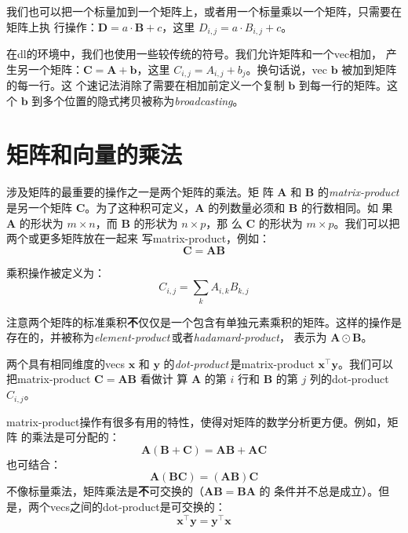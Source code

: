 我们也可以把一个标量加到一个矩阵上，或者用一个标量乘以一个矩阵，只需要在矩阵上执
行操作：$\pmb{D} = a \cdot \pmb{B} + c$，这里 $D_{i,j} = a \cdot B_{i,j} + c$。

在\gls*{dl}的环境中，我们也使用一些较传统的符号。我们允许矩阵和一个\gls*{vec}相加，
产生另一个矩阵：$\pmb{C} = \pmb{A} + \pmb{b}$，这里
$C_{i,j} = A_{i,j} + b_j$。换句话说，\gls*{vec} $\pmb{b}$ 被加到矩阵的每一行。这
个速记法消除了需要在相加前定义一个复制 $\pmb{b}$ 到每一行的矩阵。这个 $\pmb{b}$
到多个位置的隐式拷贝被称为\emph{\gls{broadcasting}}。

\section{矩阵和向量的乘法}
\label{sec:multiplying_matrices_and_vectors}

涉及矩阵的最重要的操作之一是两个矩阵的乘法。矩
阵 $\pmb{A}$ 和 $\pmb{B}$ 的\emph{\gls{matrix-product}}\,是另一个矩阵
$\pmb{C}$。为了这种积可定义，$\pmb{A}$ 的列数量必须和 $\pmb{B}$ 的行数相同。如
果 $\pmb{A}$ 的形状为 $m \times n$，而 $\pmb{B}$ 的形状为 $n \times p$，那
么 $\pmb{C}$ 的形状为 $m \times p$。我们可以把两个或更多矩阵放在一起来
写\gls*{matrix-product}，例如：
\begin{equation}
  \pmb{C} = \pmb{A}\pmb{B}
  \label{eq:matrix_product}
\end{equation}

乘积操作被定义为：
\begin{equation}
  C_{i,j} = \sum_{k}A_{i,k}B_{k,j}
  \label{eq:product_operation}
\end{equation}

注意两个矩阵的标准乘积\textbf{不}仅仅是一个包含有单独元素乘积的矩阵。这样的操作是
存在的，并被称为\emph{\gls{element-product}}\,或者\emph{\gls{hadamard-product}}，
表示为 $\pmb{A} \odot \pmb{B}$。

两个具有相同维度的\gls*{vecs}
$\pmb{x}$ 和 $\pmb{y}$ 的\emph{\gls{dot-product}}\,是\gls*{matrix-product}
$\pmb{x}^{\top}\pmb{y}$。我们可以把\gls*{matrix-product} $\pmb{C} =
\pmb{A}\pmb{B}$ 看做计
算 $\pmb{A}$ 的第 $i$ 行和 $\pmb{B}$ 的第 $j$ 列的\gls*{dot-product} $C_{i,j}$。

\gls*{matrix-product}操作有很多有用的特性，使得对矩阵的数学分析更方便。例如，矩阵
的乘法是可分配的：
\begin{equation}
  \pmb{A}(\pmb{B} + \pmb{C}) = \pmb{A}\pmb{B} + \pmb{A}\pmb{C}
  \label{eq:distributive_matrix_multiplication}
\end{equation}
也可结合：
\begin{equation}
  \pmb{A}(\pmb{B}\pmb{C}) = (\pmb{A}\pmb{B})\pmb{C}
  \label{eq:associative_matrix_multiplication}
\end{equation}
不像标量乘法，矩阵乘法是\textbf{不}可交换的（$\pmb{A}\pmb{B} = \pmb{B}\pmb{A}$ 的
条件并不总是成立）。但是，两个\gls*{vecs}之间的\gls*{dot-product}是可交换的：
\begin{equation}
  \pmb{x}^{\top}\pmb{y} = \pmb{y}^{\top}\pmb{x}
  \label{eq:commutative_vec_multiplication}
\end{equation}

